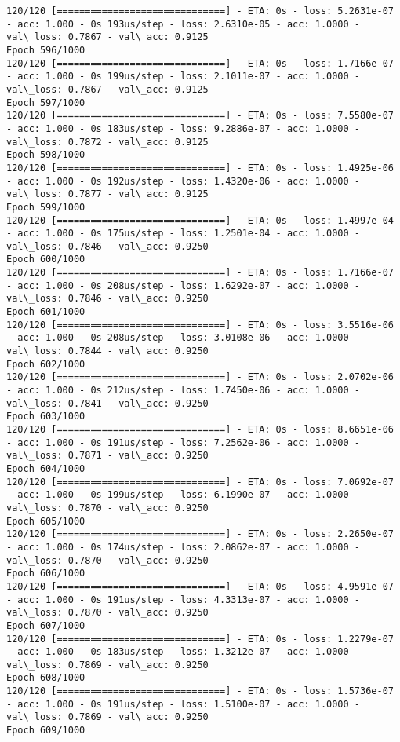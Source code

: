 \documentclass[11pt]{article}
\begin{document}
\begin{Verbatim}[commandchars=\\\{\}]
120/120 [==============================] - ETA: 0s - loss: 5.2631e-07 - acc: 1.000 - 0s 193us/step - loss: 2.6310e-05 - acc: 1.0000 - val\_loss: 0.7867 - val\_acc: 0.9125
Epoch 596/1000
120/120 [==============================] - ETA: 0s - loss: 1.7166e-07 - acc: 1.000 - 0s 199us/step - loss: 2.1011e-07 - acc: 1.0000 - val\_loss: 0.7867 - val\_acc: 0.9125
Epoch 597/1000
120/120 [==============================] - ETA: 0s - loss: 7.5580e-07 - acc: 1.000 - 0s 183us/step - loss: 9.2886e-07 - acc: 1.0000 - val\_loss: 0.7872 - val\_acc: 0.9125
Epoch 598/1000
120/120 [==============================] - ETA: 0s - loss: 1.4925e-06 - acc: 1.000 - 0s 192us/step - loss: 1.4320e-06 - acc: 1.0000 - val\_loss: 0.7877 - val\_acc: 0.9125
Epoch 599/1000
120/120 [==============================] - ETA: 0s - loss: 1.4997e-04 - acc: 1.000 - 0s 175us/step - loss: 1.2501e-04 - acc: 1.0000 - val\_loss: 0.7846 - val\_acc: 0.9250
Epoch 600/1000
120/120 [==============================] - ETA: 0s - loss: 1.7166e-07 - acc: 1.000 - 0s 208us/step - loss: 1.6292e-07 - acc: 1.0000 - val\_loss: 0.7846 - val\_acc: 0.9250
Epoch 601/1000
120/120 [==============================] - ETA: 0s - loss: 3.5516e-06 - acc: 1.000 - 0s 208us/step - loss: 3.0108e-06 - acc: 1.0000 - val\_loss: 0.7844 - val\_acc: 0.9250
Epoch 602/1000
120/120 [==============================] - ETA: 0s - loss: 2.0702e-06 - acc: 1.000 - 0s 212us/step - loss: 1.7450e-06 - acc: 1.0000 - val\_loss: 0.7841 - val\_acc: 0.9250
Epoch 603/1000
120/120 [==============================] - ETA: 0s - loss: 8.6651e-06 - acc: 1.000 - 0s 191us/step - loss: 7.2562e-06 - acc: 1.0000 - val\_loss: 0.7871 - val\_acc: 0.9250
Epoch 604/1000
120/120 [==============================] - ETA: 0s - loss: 7.0692e-07 - acc: 1.000 - 0s 199us/step - loss: 6.1990e-07 - acc: 1.0000 - val\_loss: 0.7870 - val\_acc: 0.9250
Epoch 605/1000
120/120 [==============================] - ETA: 0s - loss: 2.2650e-07 - acc: 1.000 - 0s 174us/step - loss: 2.0862e-07 - acc: 1.0000 - val\_loss: 0.7870 - val\_acc: 0.9250
Epoch 606/1000
120/120 [==============================] - ETA: 0s - loss: 4.9591e-07 - acc: 1.000 - 0s 191us/step - loss: 4.3313e-07 - acc: 1.0000 - val\_loss: 0.7870 - val\_acc: 0.9250
Epoch 607/1000
120/120 [==============================] - ETA: 0s - loss: 1.2279e-07 - acc: 1.000 - 0s 183us/step - loss: 1.3212e-07 - acc: 1.0000 - val\_loss: 0.7869 - val\_acc: 0.9250
Epoch 608/1000
120/120 [==============================] - ETA: 0s - loss: 1.5736e-07 - acc: 1.000 - 0s 191us/step - loss: 1.5100e-07 - acc: 1.0000 - val\_loss: 0.7869 - val\_acc: 0.9250
Epoch 609/1000

\end{Verbatim}
\end{document}
